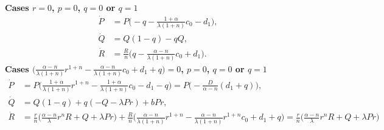 \documentclass[a4paper,11pt]{article}
\begin{document}
\noindent
{\bf Cases $r=0$, $p=0$, $q=0$ or $q=1$}
\begin{align*}
 \dot{P} &=P\Big(-q-\frac{1+\alpha}{\lambda(1+n)} c_0 -d_1\Big),\\
 \dot{Q} &=Q(1-q) -qQ,\\
 \dot{R} &=\frac{R}{n}\Big(q-\frac{\alpha-n}{\lambda(1+n)} c_0 +d_1 \Big).
\end{align*}
\noindent
{\bf Cases $\Big( \frac{\alpha-n}{\lambda(1+n)} r^{1+n} - \frac{\alpha-n}{\lambda(1+n)}c_0 + d_1 + q \Big)=0$, $p=0$, $q=0$ or $q=1$}
\begin{align*}
 \dot{P}&=P\Big( \frac{1+\alpha}{\lambda(1+n)} r^{1+n} - \frac{1+\alpha}{\lambda(1+n)} c_0 -d_1-q\Big) = P\Big(-\frac{D}{\alpha-n}(d_1+q)\Big),\\
 \dot{Q}&=Q(1-q) +q(-Q-\lambda Pr) + bPr,\\
 \dot{R}&=\frac{r}{n}\Big( \frac{\alpha-n}{\lambda} r^nR + Q + \lambda Pr\Big) + \frac{R}{n}\Big(\frac{\alpha-n}{\lambda(1+n)}r^{1+n}-\frac{\alpha-n}{\lambda(1+n)}r^{1+n}c_0 + d_1 +q\Big) = \frac{r}{n}\Big( \frac{\alpha-n}{\lambda} r^nR + Q + \lambda Pr\Big)
\end{align*}
\end{document}
